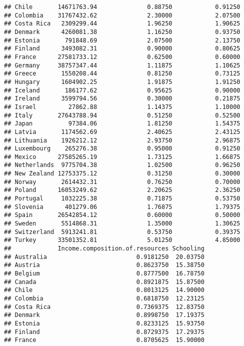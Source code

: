 \documentclass[
]{article}
\begin{document}
\begin{verbatim}
## Chile       14671763.94              0.88750            0.91250
## Colombia    31767432.62              2.30000            2.07500
## Costa Rica   2309299.44              1.96250            1.90625
## Denmark      4260081.38              1.16250            0.93750
## Estonia       791848.69              2.07500            2.13750
## Finland      3493082.31              0.90000            0.80625
## France      27581733.12              0.62500            0.60000
## Germany     38757347.44              1.11875            1.10625
## Greece       1550208.44              0.81250            0.73125
## Hungary      1604902.25              1.91875            1.91250
## Iceland       186177.62              0.95625            0.90000
## Ireland      3599794.56              0.30000            0.21875
## Israel         27862.88              1.14375            1.10000
## Italy       27643788.94              0.51250            0.52500
## Japan          97384.06              1.81250            1.54375
## Latvia       1174562.69              2.40625            2.43125
## Lithuania    1926212.12              2.93750            2.96875
## Luxembourg    265276.38              0.95000            0.91250
## Mexico      27585265.19              1.73125            1.66875
## Netherlands  9775704.38              1.02500            0.96250
## New Zealand 12753375.12              0.31250            0.30000
## Norway       2614432.31              0.76250            0.70000
## Poland      16053249.62              2.20625            2.36250
## Portugal     1032225.38              0.71875            0.53750
## Slovenia      401279.06              1.76875            1.79375
## Spain       26542854.12              0.60000            0.50000
## Sweden       5514868.31              1.35000            1.30625
## Switzerland  5913241.81              0.53750            0.39375
## Turkey      33501352.81              5.01250            4.85000
##             Income.composition.of.resources Schooling
## Australia                         0.9181250  20.03750
## Austria                           0.8623750  15.38750
## Belgium                           0.8777500  16.78750
## Canada                            0.8921875  15.87500
## Chile                             0.8013125  14.90000
## Colombia                          0.6818750  12.23125
## Costa Rica                        0.7369375  12.83750
## Denmark                           0.8998750  17.19375
## Estonia                           0.8233125  15.93750
## Finland                           0.8729375  17.29375
## France                            0.8705625  15.90000

\end{verbatim}
\end{document}

